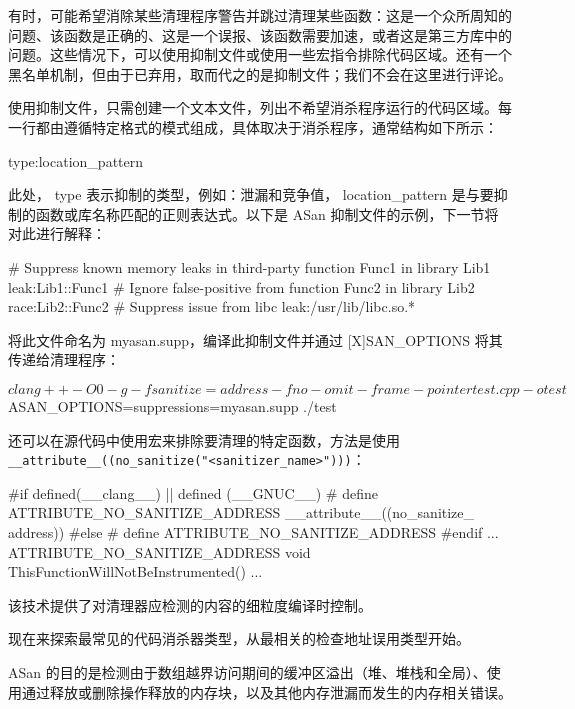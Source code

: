 
有时，可能希望消除某些清理程序警告并跳过清理某些函数：这是一个众所周知的问题、该函数是正确的、这是一个误报、该函数需要加速，或者这是第三方库中的问题。这些情况下，可以使用抑制文件或使用一些宏指令排除代码区域。还有一个黑名单机制，但由于已弃用，取而代之的是抑制文件；我们不会在这里进行评论。

使用抑制文件，只需创建一个文本文件，列出不希望消杀程序运行的代码区域。每一行都由遵循特定格式的模式组成，具体取决于消杀程序，通常结构如下所示：

\begin{shell}
type:location_pattern
\end{shell}

此处， type 表示抑制的类型，例如：泄漏和竞争值， location\_pattern 是与要抑制的函数或库名称匹配的正则表达式。以下是 ASan 抑制文件的示例，下一节将对此进行解释：

\begin{shell}
# Suppress known memory leaks in third-party function Func1 in library
Lib1
leak:Lib1::Func1
# Ignore false-positive from function Func2 in library Lib2
race:Lib2::Func2
# Suppress issue from libc
leak:/usr/lib/libc.so.*
\end{shell}

将此文件命名为 myasan.supp，编译此抑制文件并通过 [X]SAN\_OPTIONS 将其传递给清理程序：

\begin{shell}
$ clang++ -O0 -g -fsanitize=address -fno-omit-frame-pointer test.cpp -o test
$ ASAN_OPTIONS=suppressions=myasan.supp ./test
\end{shell}

还可以在源代码中使用宏来排除要清理的特定函数，方法是使用 \verb|__attribute__((no_sanitize("<sanitizer_name>")))|：

\begin{cpp}
#if defined(__clang__) || defined (__GNUC__)
# define ATTRIBUTE_NO_SANITIZE_ADDRESS __attribute__((no_sanitize_
address))
#else
# define ATTRIBUTE_NO_SANITIZE_ADDRESS
#endif
...
ATTRIBUTE_NO_SANITIZE_ADDRESS
void ThisFunctionWillNotBeInstrumented() {...}
\end{cpp}

该技术提供了对清理器应检测的内容的细粒度编译时控制。

现在来探索最常见的代码消杀器类型，从最相关的检查地址误用类型开始。


ASan 的目的是检测由于数组越界访问期间的缓冲区溢出（堆、堆栈和全局）、使用通过释放或删除操作释放的内存块，以及其他内存泄漏而发生的内存相关错误。

